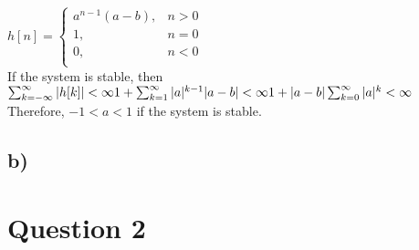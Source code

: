 \documentclass[12pt]{article}
\begin{document}
    \begin{math}
      h[n] = \begin{cases}
        a^{n-1}(a-b),& n>0 \\
        1,& n=0\\
        0,& n<0\\
      \end{cases}
    \end{math}\\
    If the system is stable, then\\
    \begin{math}
      \sum_{k = -\infty}^{\infty}|h[k]| < \infty\\
      1 + \sum_{k = 1}^{\infty}|a|^{k-1}|a-b| < \infty  \\
      1 + |a-b|\sum_{k = 0}^{\infty}|a|^k < \infty\\
    \end{math}
    Therefore, \(-1< a < 1\) if the system is stable.
    \subsection*{b)}
    
    
    \section*{Question 2}
\end{document}
